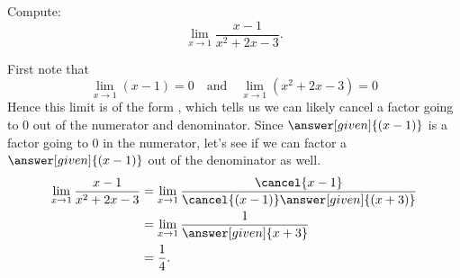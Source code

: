 \documentclass{ximera}
\begin{document}
\begin{example}
  Compute:
  \[
  \lim_{x\to1}\frac{x-1}{x^2+2x-3}.
  \]
  \begin{explanation}
    First note that
    \[
    \lim_{x\to1}\left(x-1\right)=0 \quad\text{and}\quad  \lim_{x\to1}\left(x^2+2x-3\right) = 0
    \]
    Hence this limit is of the form \zeroOverZero, which tells us we
    can likely cancel a factor going to $0$ out of the numerator and
    denominator.  Since $\answer[given]{(x-1)}$ is a factor going to $0$ in the
    numerator, let's see if we can factor a $\answer[given]{(x-1)}$ out of the
    denominator as well.
    \begin{align*}
      \lim_{x\to1}\frac{x-1}{x^2+2x-3}&=\lim_{x\to1}\frac{\cancel{x-1}}{\cancel{(x-1)}\answer[given]{(x+3)}} \\
      &=\lim_{x\to1}\frac{1}{\answer[given]{x+3}}\\
      &=\frac{1}{4}.
    \end{align*}
  \end{explanation}
\end{example}
\end{document}

